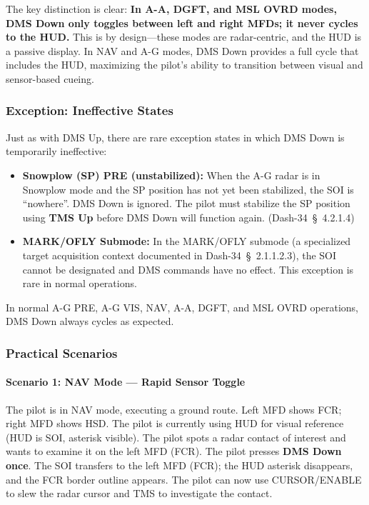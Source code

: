 \documentclass[11pt,a4paper]{article}
\providecommand{\dashref}[1]{Dash-34~\S~#1}
\begin{document}
The key distinction is clear: \textbf{In A-A, DGFT, and MSL OVRD modes, DMS Down only toggles between left and right MFDs; it never cycles to the HUD.} This is by design---these modes are radar-centric, and the HUD is a passive display. In NAV and A-G modes, DMS Down provides a full cycle that includes the HUD, maximizing the pilot's ability to transition between visual and sensor-based cueing.

\subsubsection{Exception: Ineffective States}

Just as with DMS Up, there are rare exception states in which DMS Down is temporarily ineffective:

\begin{itemize}

\item \textbf{Snowplow (SP) PRE (unstabilized):} When the A-G radar is in Snowplow mode and the SP position has not yet been stabilized, the SOI is ``nowhere''. DMS Down is ignored. The pilot must stabilize the SP position using \textbf{TMS Up} before DMS Down will function again. (\dashref{4.2.1.4})

\item \textbf{MARK/OFLY Submode:} In the MARK/OFLY submode (a specialized target acquisition context documented in \dashref{2.1.1.2.3}), the SOI cannot be designated and DMS commands have no effect. This exception is rare in normal operations.

\end{itemize}

In normal A-G PRE, A-G VIS, NAV, A-A, DGFT, and MSL OVRD operations, DMS Down always cycles as expected.

\subsubsection{Practical Scenarios}

\paragraph*{Scenario 1: NAV Mode --- Rapid Sensor Toggle}

The pilot is in NAV mode, executing a ground route. Left MFD shows FCR; right MFD shows HSD. The pilot is currently using HUD for visual reference (HUD is SOI, asterisk visible). The pilot spots a radar contact of interest and wants to examine it on the left MFD (FCR). The pilot presses \textbf{DMS Down once}. The SOI transfers to the left MFD (FCR); the HUD asterisk disappears, and the FCR border outline appears. The pilot can now use CURSOR/ENABLE to slew the radar cursor and TMS to investigate the contact.
\end{document}
